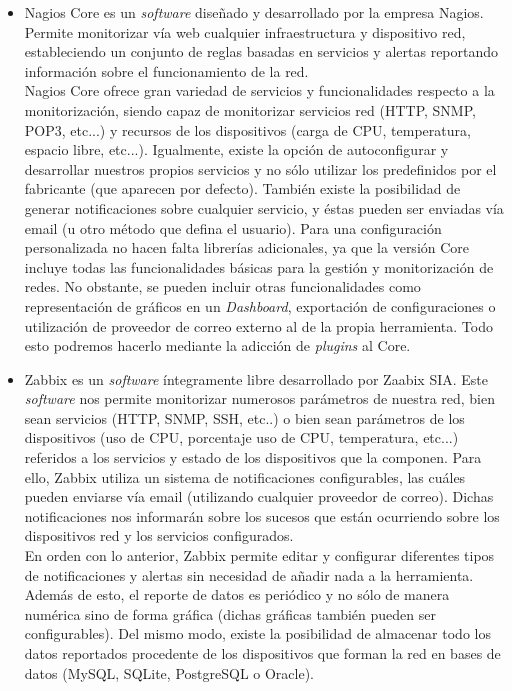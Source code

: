 	\begin{itemize}
		\item Nagios Core \cite{Nagios} es un \textit{software} diseñado y desarrollado por la empresa Nagios. Permite monitorizar vía web cualquier infraestructura y dispositivo red, estableciendo un conjunto de reglas basadas en servicios y alertas reportando información sobre el funcionamiento de la red.\\
		Nagios Core ofrece gran variedad de servicios y funcionalidades respecto a la monitorización, siendo capaz de monitorizar servicios red (HTTP, SNMP, POP3, etc...) y recursos de los dispositivos (carga de CPU, temperatura, espacio libre, etc...). Igualmente, existe la opción de autoconfigurar y desarrollar nuestros propios servicios y no sólo utilizar los predefinidos por el fabricante (que aparecen por defecto). También existe la posibilidad de generar notificaciones sobre cualquier servicio, y éstas pueden ser enviadas vía email (u otro método que defina el usuario). Para una configuración personalizada no hacen falta librerías adicionales, ya que la versión Core incluye todas las funcionalidades básicas para la gestión y monitorización de redes. No obstante, se pueden incluir otras funcionalidades como representación de gráficos en un \textit{Dashboard}, exportación de configuraciones o utilización de proveedor de correo externo al de la propia herramienta. Todo esto podremos hacerlo mediante la adicción de \textit{plugins} al Core.
		
		\item Zabbix \cite{Zabbix} es un \textit{software} íntegramente libre desarrollado por Zaabix SIA. Este \textit{software} nos permite monitorizar numerosos parámetros de nuestra red, bien sean servicios (HTTP, SNMP, SSH, etc..) o bien sean parámetros de los dispositivos (uso de CPU, porcentaje uso de CPU, temperatura, etc...) referidos a los servicios y estado de los dispositivos que la componen. Para ello, Zabbix utiliza un sistema de notificaciones configurables, las cuáles pueden enviarse vía email (utilizando cualquier proveedor de correo). Dichas notificaciones nos informarán sobre los sucesos que están ocurriendo sobre los dispositivos red y los servicios configurados.\\
		En orden con lo anterior, Zabbix permite editar y configurar diferentes tipos de notificaciones y alertas sin necesidad de añadir nada a la herramienta. Además de esto, el reporte de datos es periódico y no sólo de manera numérica sino de forma gráfica (dichas gráficas también pueden ser configurables). Del mismo modo, existe la posibilidad de almacenar todo los datos reportados procedente de los dispositivos que forman la red en bases de datos (MySQL, SQLite, PostgreSQL o Oracle).
		

\end{itemize}
